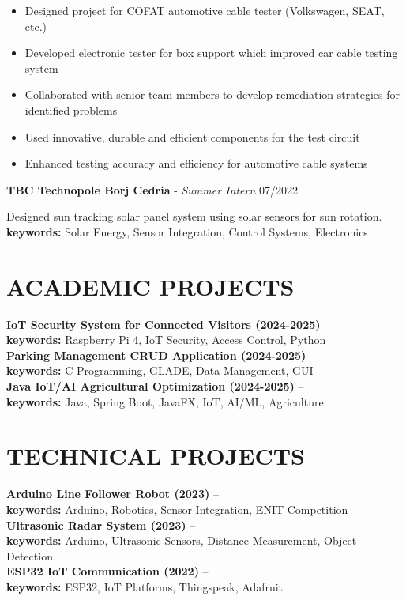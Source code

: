 \documentclass[a4paper,9pt]{extarticle}
\begin{document}
\begin{itemize}
    \item Designed project for COFAT automotive cable tester (Volkswagen, SEAT, etc.)
    \item Developed electronic tester for box support which improved car cable testing system
    \item Collaborated with senior team members to develop remediation strategies for identified problems
    \item Used innovative, durable and efficient components for the test circuit
    \item Enhanced testing accuracy and efficiency for automotive cable systems
\end{itemize}

\textbf{TBC Technopole Borj Cedria} - \textit{Summer Intern} \hfill 07/2022

Designed sun tracking solar panel system using solar sensors for sun rotation. \\ 
 \phantom{aaa} \textbf{keywords:} Solar Energy, Sensor Integration, Control Systems, Electronics

\section*{ACADEMIC PROJECTS}
\textbf{IoT Security System for Connected Visitors (2024-2025)} -- \href{https://github.com/Guizaa22}{\textcolor{blue}{\faGithub}} \\
\phantom{aaa} \textbf{keywords:} Raspberry Pi 4, IoT Security, Access Control, Python
\\
\textbf{Parking Management CRUD Application (2024-2025)} -- \href{https://github.com/Guizaa22}{\textcolor{blue}{\faGithub}} \\
\phantom{aaa} \textbf{keywords:} C Programming, GLADE, Data Management, GUI
\\
\textbf{Java IoT/AI Agricultural Optimization (2024-2025)} -- \href{https://github.com/Guizaa22}{\textcolor{blue}{\faGithub}} \\
\phantom{aaa} \textbf{keywords:} Java, Spring Boot, JavaFX, IoT, AI/ML, Agriculture

\section*{TECHNICAL PROJECTS}
\textbf{Arduino Line Follower Robot (2023)} -- \href{https://github.com/Guizaa22}{\textcolor{blue}{\faGithub}} \\
\phantom{aaa} \textbf{keywords:} Arduino, Robotics, Sensor Integration, ENIT Competition
\\
\textbf{Ultrasonic Radar System (2023)} -- \href{https://github.com/Guizaa22}{\textcolor{blue}{\faGithub}} \\
\phantom{aaa} \textbf{keywords:} Arduino, Ultrasonic Sensors, Distance Measurement, Object Detection
\\
\textbf{ESP32 IoT Communication (2022)} -- \href{https://github.com/Guizaa22}{\textcolor{blue}{\faGithub}} \\
\phantom{aaa} \textbf{keywords:} ESP32, IoT Platforms, Thingspeak, Adafruit
\end{document}
